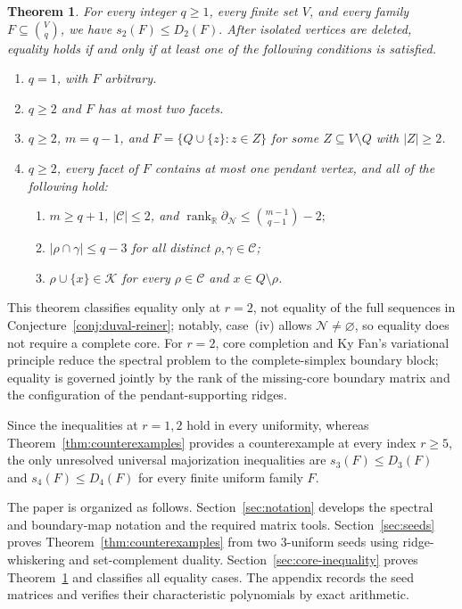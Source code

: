 \documentclass[11pt]{article}
\newtheorem{theorem}{Theorem}[section]
\newcommand{\R}{\mathbb{R}}
\newcommand{\rank}{\operatorname{rank}}
\newcommand{\bd}{\partial}
\newcommand{\calC}{\mathcal{C}}
\newcommand{\calK}{\mathcal{K}}
\newcommand{\calN}{\mathcal{N}}
\begin{document}
\begin{theorem}
	\label{thm:main-inequality}
	For every integer \(q\ge1\), every finite set \(V\), and every family
\(F\subseteq\binom{V}{q}\), we have $s_2(F)\le D_2(F).$
	After isolated vertices are deleted, equality holds if and only if at
	least one of the following conditions is satisfied.
	\begin{enumerate}[label=\textup{(\roman*)},leftmargin=*]
		\item \(q=1\), with \(F\) arbitrary.

		\item \(q\geq2\) and \(F\) has at most two facets.

		\item \(q\geq2\), \(m=q-1\), and \( F=\{Q\cup\{z\}:z\in Z\} \)  for some \(Z\subseteq V\setminus Q\) with \(|Z|\geq2\).

		\item \(q\ge2\), every facet of \(F\) contains at most one pendant
		vertex, and all of the following hold:
		\begin{enumerate}[label=\textup{(\alph*)},leftmargin=2.4em]
			\item \(m\ge q+1\), \(|\calC|\le2\), and
			\(
				\rank_{\R}\bd_{\calN}
				\le\binom{m-1}{q-1}-2;
			\)
			\item \(|\rho\cap\gamma|\le q-3\) for all distinct
			\(\rho,\gamma\in\calC\);
			\item \(\rho\cup\{x\}\in\calK\) for every
			\(\rho\in\calC\) and \(x\in Q\setminus\rho\).
		\end{enumerate}
	\end{enumerate}
\end{theorem}
This theorem classifies equality only at \(r=2\), not equality of the
full sequences in Conjecture~\ref{conj:duval-reiner}; notably,
case~\textup{(iv)} allows \(\calN\neq\varnothing\), so equality does not
require a complete core. For \(r=2\), core
completion and Ky Fan's variational principle reduce the spectral problem
to the complete-simplex boundary block; equality is governed jointly by
the rank of the missing-core boundary matrix and the configuration of the
pendant-supporting ridges.

Since the inequalities at \(r=1,2\) hold in every uniformity, whereas
Theorem~\ref{thm:counterexamples} provides a counterexample at every
index \(r\ge5\), the only unresolved universal majorization inequalities
are $s_3(F)\le D_3(F)$ and $s_4(F)\le D_4(F)$
for every finite uniform family \(F\).

The paper is organized as follows.
Section~\ref{sec:notation} develops the spectral and boundary-map
notation and the required matrix tools.
Section~\ref{sec:seeds} proves Theorem~\ref{thm:counterexamples} from two
\(3\)-uniform seeds using ridge-whiskering and set-complement duality.
Section~\ref{sec:core-inequality} proves
Theorem~\ref{thm:main-inequality} and classifies all equality cases.
The appendix records the seed matrices and verifies their characteristic
polynomials by exact arithmetic.
	
\end{document}
